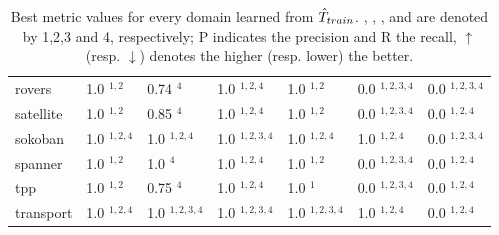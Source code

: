 \begin{table}[H]
{\begin{tabular}{|l|l|l|l|l|l|l|}
rovers & 1.0 $^{1,2}$ & 0.74 $^{4}$ & 1.0 $^{1,2,4}$ & 1.0 $^{1,2}$ & 0.0 $^{1,2,3,4}$ & 0.0 $^{1,2,3,4}$ \\
satellite & 1.0 $^{1,2}$ & 0.85 $^{4}$ & 1.0 $^{1,2,4}$ & 1.0 $^{1,2}$ & 0.0 $^{1,2,3,4}$ & 0.0 $^{1,2,4}$ \\
sokoban & 1.0 $^{1,2,4}$ & 1.0 $^{1,2,4}$ & 1.0 $^{1,2,3,4}$ & 1.0 $^{1,2,4}$ & 1.0 $^{1,2,4}$ & 0.0 $^{1,2,3,4}$ \\
spanner & 1.0 $^{1,2}$ & 1.0 $^{4}$ & 1.0 $^{1,2,4}$ & 1.0 $^{1,2}$ & 0.0 $^{1,2,3,4}$ & 0.0 $^{1,2,4}$ \\
tpp & 1.0 $^{1,2}$ & 0.75 $^{4}$ & 1.0 $^{1,2,4}$ & 1.0 $^{1}$ & 0.0 $^{1,2,3,4}$ & 0.0 $^{1,2,4}$ \\
transport & 1.0 $^{1,2,4}$ & 1.0 $^{1,2,3,4}$ & 1.0 $^{1,2,3,4}$ & 1.0 $^{1,2,3,4}$ & 1.0 $^{1,2,4}$ & 0.0 $^{1,2,4}$ \\
\hline
\end{tabular}
}
\caption{Best metric values for every domain learned from $\hat{T}_{train}$. \sam, \offlam, \rosame, and \nolam are denoted by 1,2,3 and 4, respectively; P indicates the precision and R the recall, $\uparrow$ (resp. $\downarrow$) denotes the higher (resp. lower) the better.
}
\label{tab:best-2traces}
\end{table}